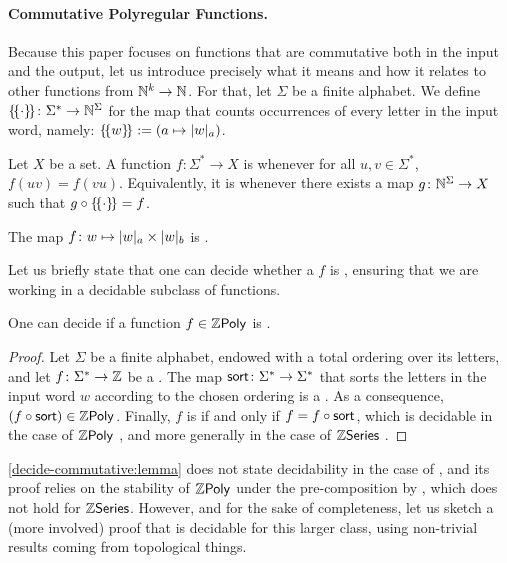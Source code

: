 \AP 
\paragraph{Commutative Polyregular Functions.}
Because this paper focuses on functions that are commutative both in the
input and the output, let us introduce precisely what it means and how it
relates to other functions from $\mathbb{N}^k \to \mathbb{N}$. For that, let $\Sigma$ be a
finite alphabet. We define $\commute \colon \Sigma^* \to \Nat^\Sigma$ for the
map that counts occurrences of every letter in the input word, namely: $
\commute[w] \defined (a \mapsto \card[a]{w})$.

\AP Let $X$ be a set. A function $f \colon \Sigma^* \to X$ is
 whenever for all $u,v \in \Sigma^*$, $f(uv) = f(vu)$.
Equivalently, it is  whenever there exists a map $g \colon
\mathbb{N}^\Sigma \to X$ such that $g \circ \commute = f$.

\begin{example}
    \label{commutative-function:ex}
    The map $f \colon w \mapsto \card[a]{w} \times \card[b]{w}$ is .
\end{example}

Let us briefly state that one can decide whether a  $f$ is , ensuring that we are working in a decidable
subclass of functions. 

\begin{lemma}
    \label{decide-commutative:lemma}
    One can decide if a function $f \in \ZPoly$
    is .
\end{lemma}
\begin{proof}
    Let $\Sigma$ be a finite alphabet, endowed with a
    total ordering over its letters,
    and let $f \colon \Sigma^* \to \mathbb{Z}$ be a
    .
    The map $\mathsf{sort} \colon \Sigma^* \to \Sigma^*$
    that sorts the letters in the input word $w$ according
    to the chosen ordering is a 
    \cite[Proposition II.12]{LOPEZ23b}.
    As a consequence,
    $(f \circ \polysort) \in \ZPoly$.
    Finally, $f$ is  if and only
    if $f = f \circ \mathsf{sort}$, which is decidable
    in the case of $\ZPoly$
    \cite[Corollary II.24]{LOPEZ23b}, and more generally in the case 
    of $\mathbb{Z}\mathsf{Series}$ \cite[Corollary 3.6 p 38]{berstel2011noncommutative}.
\end{proof}

\cref{decide-commutative:lemma} does not state decidability in the case of
, and its proof relies on the stability of $\ZPoly$
under the pre-composition by , which does not hold
for $\mathbb{Z}\mathsf{Series}$. However, and for the sake of completeness, let us sketch a (more
involved) proof that  is decidable for this larger class,
using non-trivial results coming from topological things.

